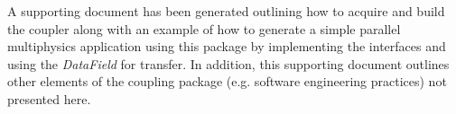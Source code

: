 \documentclass[letterpaper]{article}
\begin{document}
A supporting document has been generated outlining how to acquire and
build the coupler along with an example of how to generate a simple
parallel multiphysics application using this package by implementing
the interfaces and using the {\sl DataField} for transfer. In
addition, this supporting document outlines other elements of the
coupling package (e.g. software engineering practices) not presented
here. 

\pagebreak


\end{document}
